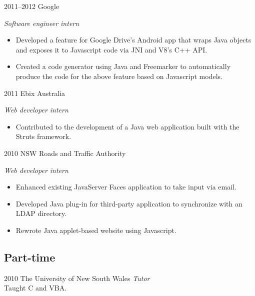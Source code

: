 \documentclass[]{friggeri-cv} %
\begin{document}
\begin{entrylist}


\entry
{2011--2012}
{Google}
{}
{\emph{Software engineer intern}
\begin{itemize}
\item Developed a feature for Google Drive's Android app that wraps Java objects and exposes it to Javascript code via JNI and V8's C++ API.
\item Created a code generator using Java and Freemarker to automatically produce the code for the above feature based on Javascript models.
\end{itemize}}


\entry
{2011}
{Ebix Australia}
{}
{\emph{Web developer intern}
\begin{itemize}
\item Contributed to the development of a Java web application built with the Struts framework.
\end{itemize}}


\entry
{2010}
{NSW Roads and Traffic Authority}
{}
{\emph{Web developer intern}
\begin{itemize}
\item Enhanced existing JavaServer Faces application to take input via email.
\item Developed Java plug-in for third-party application to synchronize with an LDAP directory.
\item Rewrote Java applet-based website using Javascript.
\end{itemize}}


\end{entrylist}

\subsection{Part-time}

\begin{entrylist}


\entry
{2010}
{The University of New South Wales}
{}
{\emph{Tutor} \\
Taught C and VBA.}


\end{entrylist}
\end{document}
